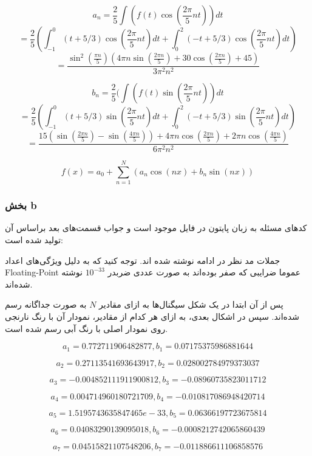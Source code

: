 \documentclass[12pt]{article}
\begin{document}
$$a_n = \frac{2}{5} \int (f(t) \cos (\frac{2\pi}{5} n t)) dt$$
$$ =\frac{2}{5} (\int_{-1}^{0} (t+5/3) \cos(\frac{2 \pi}{5} n t) dt + \int_{0}^{2} (-t + 5/3) \cos (\frac{2 \pi}{5} n t) dt)$$
$$= \frac{\sin ^2\left(\frac{\pi  n}{5}\right) \left(4 \pi  n \sin \left(\frac{2 \pi  n}{5}\right)+30 \cos \left(\frac{2 \pi  n}{5}\right)+45\right)}{3 \pi ^2 n^2}$$


$$b_n = \frac{2}{5} (\int (f(t) \sin (\frac{2\pi}{5} n t)) dt$$
$$ =\frac{2}{5}( \int_{-1}^{0} (t+5/3) \sin(\frac{2 \pi}{5} n t) dt + \int_{0}^{2} (-t + 5/3) \sin (\frac{2 \pi}{5} n t) dt)$$
$$= \frac{15 \left(\sin \left(\frac{2 \pi  n}{5}\right)-\sin \left(\frac{4 \pi  n}{5}\right)\right)+4 \pi  n \cos \left(\frac{2 \pi  n}{5}\right)+2 \pi  n \cos \left(\frac{4 \pi  n}{5}\right)}{6 \pi ^2 n^2}$$



$$f(x) = a_0 + \sum_{n=1}^{N} (a_n \cos (n x) + b_n \sin (n x))$$




\subsubsection{بخش b}

کدهای مسئله به زبان پایتون در فایل 
موجود است و جواب قسمت‌های بعد براساس آن تولید شده است:

جملات مد نظر در ادامه نوشته شده اند. توجه کنید که به دلیل ویژگی‌های اعداد Floating-Point عموما ضرایبی که صفر بوده‌اند به صورت عددی ضربدر $10^{-33}$ نوشته شده‌اند.

پس از آن ابتدا در یک شکل سیگنال‌ها به ازای مقادیر $N$ به صورت جداگانه رسم شده‌اند. سپس در اشکال بعدی، به ازای هر کدام از مقادیر، نمودار آن با رنگ نارنجی روی نمودار اصلی با رنگ آبی رسم شده است.



$$a_{ 1 } = 0.772711906482877 , b_{ 1 } = 0.07175375986881644$$

$$a_{ 2 } = 0.27113541693643917 , b_{ 2 } = 0.028002784979373037$$

$$a_{ 3 } = -0.004852111911900812 , b_{ 3 } = -0.08960735823011712$$

$$a_{ 4 } = 0.004714960180721709 , b_{ 4 } = -0.010817086948420714$$

$$a_{ 5 } = 1.5195743635847465e-33 , b_{ 5 } = 0.06366197723675814$$

$$a_{ 6 } = 0.04083290139095018 , b_{ 6 } = -0.0008212742065860439$$

$$a_{ 7 } = 0.04515821107548206 , b_{ 7 } = -0.011886611106858576$$
\end{document}
